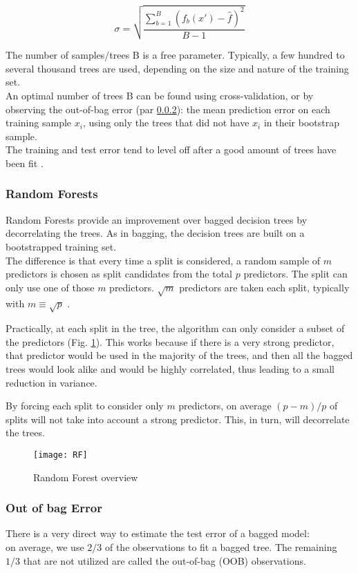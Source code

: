 \begin{equation}
	{\sigma ={\sqrt {\frac {\sum_{b=1}^{B}(f_{b}(x')-{\hat {f}})^{2}}{B-1}}}}
\end{equation}

The number of samples/trees B is a free parameter. Typically, a few hundred to several thousand trees are used, depending on the size and nature of the training set. \\
An optimal number of trees B can be found using cross-validation, or by observing the out-of-bag error (par \ref{oob}): the mean prediction error on each training sample $x_i$, using only the trees that did not have $x_i$ in their bootstrap sample. \\
The training and test error tend to level off after a good amount of trees have been fit \cite{ISLR}.


\subsubsection{Random Forests}
Random Forests provide an improvement over bagged decision trees by decorrelating the trees. As in bagging, the decision trees are built on a bootstrapped training set. \\
The difference is that every time a split is considered, a random sample of $m$ predictors is chosen as split candidates from the total $p$ predictors. The split can only use one of those $m$ predictors. $\sqrt{m}$ predictors are taken each split, typically with $m \equiv \sqrt{p}$ \cite{ISLR}.

Practically, at each split in the tree, the algorithm can only consider a subset of the predictors (Fig. \ref{fig:RF}). This works because if there is a very strong predictor, that predictor would be used in the majority of the trees, and then all the bagged trees would look alike and would be highly correlated, thus leading to a small reduction in variance.

By forcing each split to consider only $m$ predictors, on average $(p - m)/p$ of splits will not take into account a strong predictor. This, in turn, will decorrelate the trees.

\begin{figure}[H]
	\centering
	\texttt{[image: RF]}
	\caption{Random Forest overview}
	\label{fig:RF}
\end{figure}

\subsubsection{Out of bag Error} \label{oob}
There is a very direct way to estimate the test error of a bagged model: \\
on average, we use $2/3$ of the observations to fit a bagged tree. The remaining $1/3$ that are not utilized are called the out-of-bag (OOB) observations. 

